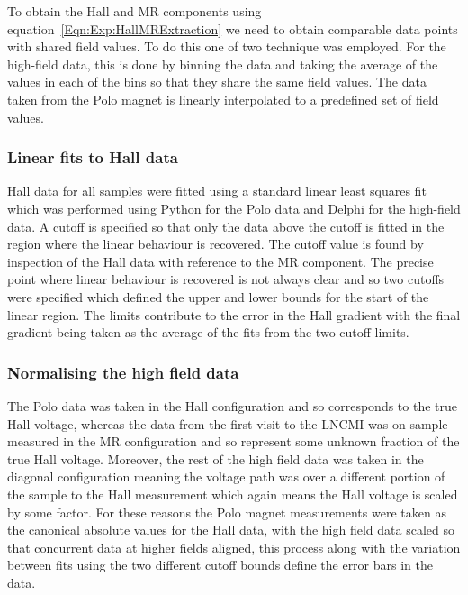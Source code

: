 To obtain the Hall and \ac{MR} components using equation~\ref{Eqn:Exp:HallMRExtraction} we need to obtain comparable data points with shared field values. To do this one of two technique was employed. For the high-field data, this is done by binning the data and taking the average of the values in each of the bins so that they share the same field values. The data taken from the Polo magnet is linearly interpolated to a predefined set of field values.

\subsubsection{Linear fits to Hall data}

Hall data for all samples were fitted using a standard linear least squares fit which was performed using Python for the Polo data and Delphi for the high-field data. A cutoff is specified so that only the data above the cutoff is fitted in the region where the linear behaviour is recovered. The cutoff value is found by inspection of the Hall data with reference to the \ac{MR} component. The precise point where linear behaviour is recovered is not always clear and so two cutoffs were specified which defined the upper and lower bounds for the start of the linear region. The limits contribute to the error in the Hall gradient with the final gradient being taken as the average of the fits from the two cutoff limits.

\subsubsection{Normalising the high field data}

The Polo data was taken in the Hall configuration and so corresponds to the true Hall voltage, whereas the data from the first visit to the \ac{LNCMI} was on sample measured in the \ac{MR} configuration and so represent some unknown fraction of the true Hall voltage. Moreover, the rest of the high field data was taken in the diagonal configuration meaning the voltage path was over a different portion of the sample to the Hall measurement which again means the Hall voltage is scaled by some factor. For these reasons the Polo magnet measurements were taken as the canonical absolute values for the Hall data, with the high field data scaled so that concurrent data at higher fields aligned, this process along with the variation between fits using the two different cutoff bounds define the error bars in the data.


